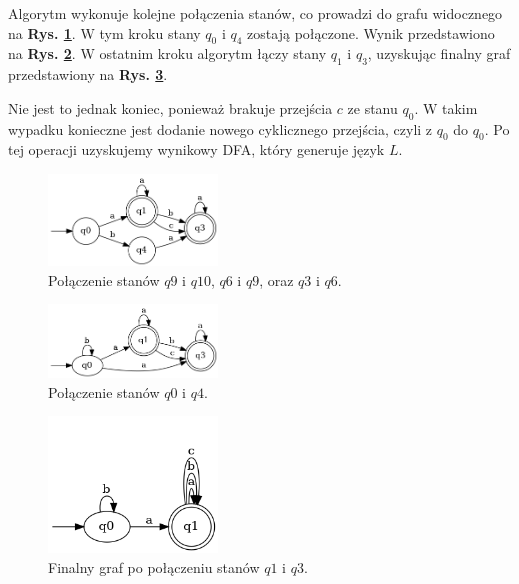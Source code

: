 Algorytm wykonuje kolejne połączenia stanów, co prowadzi do grafu widocznego na \textbf{Rys. \ref{fig:pta06}}. W tym kroku stany \( q_0 \) i \( q_4 \) zostają połączone. Wynik przedstawiono na \textbf{Rys. \ref{fig:pta07}}. W ostatnim kroku algorytm łączy stany \( q_1 \) i \( q_3 \), uzyskując finalny graf przedstawiony na \textbf{Rys. \ref{fig:pta08}}. 

Nie jest to jednak koniec, ponieważ brakuje przejścia \( c \) ze stanu \( q_0 \). W takim wypadku konieczne jest dodanie nowego cyklicznego przejścia, czyli z \( q_0 \) do \( q_0 \). Po tej operacji uzyskujemy wynikowy DFA, który generuje język \( L \).

\begin{figure}[ht]
    \centering
    \includegraphics[width=0.4\textwidth]{images/run_example/rpni/6.png}
    \caption{Połączenie stanów \( q9 \) i \( q10 \), \( q6 \) i \( q9 \), oraz \( q3 \) i \( q6 \).}
    \label{fig:pta06}
\end{figure}

\begin{figure}[ht]
    \centering
    \includegraphics[width=0.4\textwidth]{images/run_example/rpni/7.png}
    \caption{Połączenie stanów \( q0 \) i \( q4 \).}
    \label{fig:pta07}
\end{figure}

\begin{figure}[ht]
    \centering
    \includegraphics[width=0.4\textwidth]{images/run_example/rpni/8.png}
    \caption{Finalny graf po połączeniu stanów \( q1 \) i \( q3 \).}
    \label{fig:pta08}
\end{figure}
